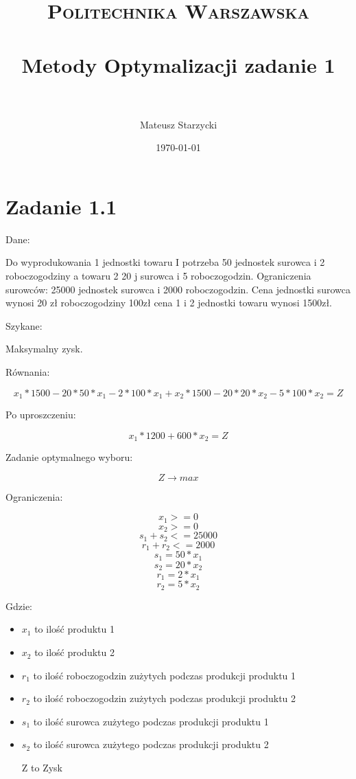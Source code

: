 \documentclass[paper=a4, fontsize=11pt]{scrartcl} %
\title{ 
    \normalfont \normalsize 
    \textsc{Politechnika Warszawska} \\ [25pt] %
    \horrule{0.5pt} \\[0.4cm] %
    \huge Metody Optymalizacji zadanie 1\\ %
    \horrule{2pt} \\[0.5cm] %
}
\author{Mateusz Starzycki} %
\date{\normalsize\today} %
\numberwithin{equation}{section} %
\numberwithin{figure}{section} %
\numberwithin{table}{section} %
\begin{document}
\maketitle %


\newpage
\section{Zadanie 1.1}

Dane:

Do wyprodukowania 1 jednostki towaru I potrzeba 50 jednostek surowca i 2 roboczogodziny a towaru 2 20 j surowca i 5 roboczogodzin.
Ograniczenia surowców: 25000 jednostek surowca i 2000 roboczogodzin.
Cena jednostki surowca wynosi 20 zł roboczogodziny 100zł cena 1 i 2 jednostki towaru wynosi 1500zł.

Szykane:

Maksymalny zysk.

Równania:

\[x_1 * 1500 - 20 * 50 * x_1 - 2 * 100 * x_1 + x_2 * 1500  - 20 * 20 * x_2 - 5 * 100 * x_2 = Z\]

Po uproszczeniu:

\[x_1 * 1200 + 600 * x_2 = Z\]

Zadanie optymalnego wyboru:

\[Z \rightarrow max\]

Ograniczenia:

\[x_1 >= 0\]
\[x_2 >= 0\]
\[s_1 + s_2 <= 25000 \]
\[r_1 + r_2 <= 2000\]
\[s_1 = 50 * x_1\]
\[s_2 = 20 * x_2\]
\[r_1 = 2 * x_1\]
\[r_2 = 5 * x_2\]

Gdzie:
\begin{itemize}
\item $ x_1 $ to ilość produktu 1 
\item $ x_2 $ to ilość produktu 2
\item $ r_1 $ to ilość roboczogodzin zużytych podczas produkcji produktu 1 
\item $ r_2 $ to ilość roboczogodzin zużytych podczas produkcji produktu 2
\item $ s_1 $ to ilość surowca zużytego podczas produkcji produktu 1 
\item $ s_2 $ to ilość surowca zużytego podczas produkcji produktu 2
\item [Z] to Zysk
\end{itemize}
\end{document}
